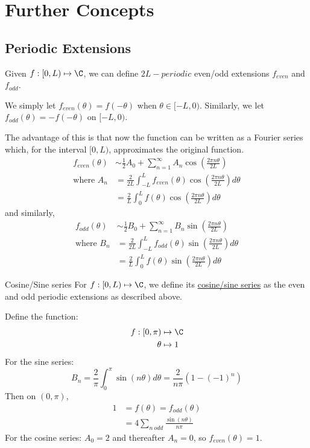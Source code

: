 \documentclass[../Main.tex]{subfiles}
\begin{document}
\section{Further Concepts}
\subsection{Periodic Extensions}
Given $f : [0, L) \mapsto \C$, we can define $2L-periodic$ even/odd extensions $f_{even}$ and $f_{odd}$.

We simply let $f_{even}(\theta) = f(-\theta)$ when $\theta \in [-L, 0)$. Similarly, we let $f_{odd}(\theta) = -f(-\theta)$ on $[-L, 0)$.

The advantage of this is that now the function can be written as a Fourier series which, for the interval $[0, L)$, approximates the original function.
\begin{align*}
    f_{even} (\theta) &\sim \frac{1}{2} A_0 + \sum_{n = 1}^\infty A_n \cos\left(\frac{2\pi n \theta}{2L}\right) \\
    \text{where } A_n &= \frac{2}{2L} \int_{-L}^L f_{even}(\theta) \cos\left(\frac{2\pi n \theta}{2L}\right)d\theta \\
    &= \frac{2}{L}\int_{0}^{L} f(\theta)\cos\left(\frac{2\pi n \theta}{2L}\right) d\theta 
\end{align*}
and similarly,
\begin{align*}
    f_{odd} (\theta) &\sim \frac{1}{2} B_0 + \sum_{n = 1}^\infty B_n \sin\left(\frac{2\pi n \theta}{2L}\right) \\
    \text{where } B_n &= \frac{2}{2L} \int_{-L}^L f_{odd}(\theta) \sin\left(\frac{2\pi n \theta}{2L}\right)d\theta \\
    &= \frac{2}{L}\int_{0}^{L} f(\theta)\sin\left(\frac{2\pi n \theta}{2L}\right) d\theta 
\end{align*}
\begin{definition}{Cosine/Sine series}
    For $f : [0, L) \mapsto \C$, we define its \underline{cosine/sine series} as the even and odd periodic extensions as described above.
\end{definition}
\begin{example}
    Define the function:
    \begin{align*}
        f : [0, \pi) &\mapsto \C \\
        \theta &\mapsto 1
    \end{align*}
    For the sine series:
    \begin{equation*}
        B_n = \frac{2}{\pi} \int_{0}^{\pi} \sin(n\theta) d\theta = \frac{2}{n\pi}\left(1 - (-1)^n\right)
    \end{equation*}
    Then on $(0, \pi)$,
    \begin{align*}
        1 &= f(\theta) = f_{odd}(\theta) \\
        &= 4 \sum_{n~odd}^{} \frac{\sin(n\theta)}{n\pi}
    \end{align*}
    For the cosine series: $A_0 = 2$ and thereafter $A_n = 0$, so $f_{even}(\theta) = 1$.
\end{example}
\end{document}
